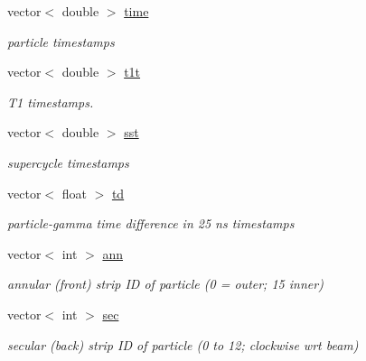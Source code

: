 \begin{DoxyCompactItemize}
\mbox{\label{classg__clx_ad1cc659d52f0fc7616fff4d94c9ca6ea}} 
vector$<$ double $>$ \hyperlink{classg__clx_ad1cc659d52f0fc7616fff4d94c9ca6ea}{time}
\begin{DoxyCompactList}\small\item\em particle timestamps \end{DoxyCompactList}\item 
\mbox{\label{classg__clx_aea439e35fbca594eb8124b7e81f97fb7}} 
vector$<$ double $>$ \hyperlink{classg__clx_aea439e35fbca594eb8124b7e81f97fb7}{t1t}
\begin{DoxyCompactList}\small\item\em T1 timestamps. \end{DoxyCompactList}\item 
\mbox{\label{classg__clx_a98fc719d6f94e8f1ccecb4978972699d}} 
vector$<$ double $>$ \hyperlink{classg__clx_a98fc719d6f94e8f1ccecb4978972699d}{sst}
\begin{DoxyCompactList}\small\item\em supercycle timestamps \end{DoxyCompactList}\item 
\mbox{\label{classg__clx_a2adb67934c7e26d01a5faa8ccb6c9c15}} 
vector$<$ float $>$ \hyperlink{classg__clx_a2adb67934c7e26d01a5faa8ccb6c9c15}{td}
\begin{DoxyCompactList}\small\item\em particle-\/gamma time difference in 25 ns timestamps \end{DoxyCompactList}\item 
\mbox{\label{classg__clx_ad017e828f9374d881ad4eac9e6ea1818}} 
vector$<$ int $>$ \hyperlink{classg__clx_ad017e828f9374d881ad4eac9e6ea1818}{ann}
\begin{DoxyCompactList}\small\item\em annular (front) strip ID of particle (0 = outer; 15 inner) \end{DoxyCompactList}\item 
\mbox{\label{classg__clx_a556dd0017434edf15b8ec9e25437a932}} 
vector$<$ int $>$ \hyperlink{classg__clx_a556dd0017434edf15b8ec9e25437a932}{sec}
\begin{DoxyCompactList}\small\item\em secular (back) strip ID of particle (0 to 12; clockwise wrt beam) \end{DoxyCompactList}\item 

\end{DoxyCompactItemize}
